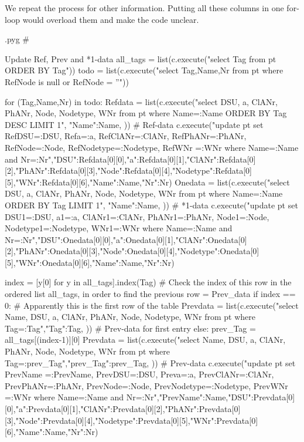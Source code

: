 \documentclass{report}
\makeatletter
\newenvironment{python}{%
  \VerbatimEnvironment
  \minted@resetoptions
  \setkeys{minted@opt}{}
      \begin{VerbatimOut}{\jobname.pyg}}
{%
      \end{VerbatimOut}
      \minted@pygmentize{python}
      \DeleteFile{\jobname.pyg}}
\makeatother
\begin{document}
We repeat the process for other information. Putting all these columns in one
for-loop would overload them and make the code unclear.

\begin{python}
#{{{ Update Ref, Prev and *1-data
all_tags = list(c.execute("select Tag from pt ORDER BY Tag"))
todo = list(c.execute("select Tag,Name,Nr from pt where RefNode is null or RefNode = ''"))

for (Tag,Name,Nr) in todo:
    Refdata = list(c.execute("select DSU, a, ClANr, PhANr, Node, Nodetype, WNr from pt where Name=:Name ORDER BY Tag DESC LIMIT 1", {"Name":Name, })) # Ref-data
    c.execute("update pt set RefDSU=:DSU, Refa=:a, RefClANr=:ClANr, RefPhANr=:PhANr, RefNode=:Node, RefNodetype=:Nodetype, RefWNr =:WNr where Name=:Name and Nr=:Nr",{"DSU":Refdata[0][0],"a":Refdata[0][1],"ClANr":Refdata[0][2],"PhANr":Refdata[0][3],"Node":Refdata[0][4],"Nodetype":Refdata[0][5],"WNr":Refdata[0][6],"Name":Name,"Nr":Nr}) 
    Onedata = list(c.execute("select DSU, a, ClANr, PhANr, Node, Nodetype, WNr from pt where Name=:Name ORDER BY Tag LIMIT 1", {"Name":Name, })) # *1-data
    c.execute("update pt set DSU1=:DSU, a1=:a, ClANr1=:ClANr, PhANr1=:PhANr, Node1=:Node, Nodetype1=:Nodetype, WNr1=:WNr where Name=:Name and Nr=:Nr",{"DSU":Onedata[0][0],"a":Onedata[0][1],"ClANr":Onedata[0][2],"PhANr":Onedata[0][3],"Node":Onedata[0][4],"Nodetype":Onedata[0][5],"WNr":Onedata[0][6],"Name":Name,"Nr":Nr}) 

    index = [y[0] for y in all_tags].index(Tag)  # Check the index of this row in the ordered list all_tags, in order to find the previous row = Prev_data 
    if index == 0:  # Apparently this is the first row of the table
        Prevdata = list(c.execute("select Name, DSU, a, ClANr, PhANr, Node, Nodetype, WNr from pt where Tag=:Tag",{"Tag":Tag, })) # Prev-data for first entry
    else:
        prev_Tag = all_tags[(index-1)][0]
        Prevdata = list(c.execute("select Name, DSU, a, ClANr, PhANr, Node, Nodetype, WNr from pt where Tag=:prev_Tag",{"prev_Tag":prev_Tag, })) # Prev-data
    c.execute("update pt set PrevName =:PrevName, PrevDSU=:DSU, Preva=:a, PrevClANr=:ClANr, PrevPhANr=:PhANr, PrevNode=:Node, PrevNodetype=:Nodetype, PrevWNr =:WNr where Name=:Name and Nr=:Nr",{"PrevName":Name,"DSU":Prevdata[0][0],"a":Prevdata[0][1],"ClANr":Prevdata[0][2],"PhANr":Prevdata[0][3],"Node":Prevdata[0][4],"Nodetype":Prevdata[0][5],"WNr":Prevdata[0][6],"Name":Name,"Nr":Nr}) 

}}}
\end{python}
\end{document}
